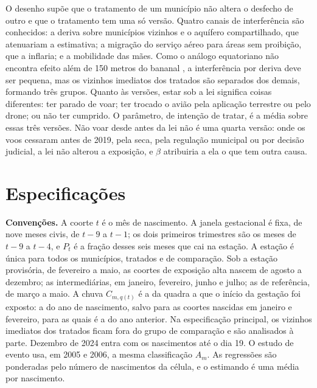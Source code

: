 \begin{apendicesenv}
O desenho supõe que o tratamento de um município não altera o desfecho de
outro e que o tratamento tem uma só versão. Quatro canais de interferência
são conhecidos: a deriva sobre municípios vizinhos e o aquífero compartilhado,
que atenuariam a estimativa; a migração do serviço aéreo para áreas sem
proibição, que a inflaria; e a mobilidade das mães. Como o análogo equatoriano não encontra efeito além de 150 metros do
bananal \cite{calzada2023bananas}, a interferência por deriva deve ser
pequena, mas os vizinhos imediatos dos tratados são separados dos demais,
formando três grupos. Quanto às versões, estar sob a lei significa coisas
diferentes: ter parado de voar; ter trocado o avião pela aplicação terrestre
ou pelo drone; ou não ter cumprido. O parâmetro, de intenção de tratar, é a
média sobre essas três versões. Não voar desde antes da lei não é uma quarta
versão: onde os voos cessaram antes de 2019, pela seca, pela regulação
municipal ou por decisão judicial, a lei não alterou a exposição, e $\beta$
atribuiria a ela o que tem outra causa.

\clearpage
\chapter{Especificações}
\label{ap:espec}

\textbf{Convenções.} A coorte $t$ é o mês de nascimento. A janela gestacional
é fixa, de nove meses civis, de $t-9$ a $t-1$; os dois primeiros trimestres
são os meses de $t-9$ a $t-4$, e $P_t$ é a fração desses seis meses que cai na
estação. A estação é única para todos os municípios, tratados e de comparação.
Sob a estação provisória, de fevereiro a maio, as coortes de exposição alta
nascem de agosto a dezembro; as intermediárias, em janeiro, fevereiro, junho e
julho; as de referência, de março a maio. A chuva $C_{m,q(t)}$ é a da quadra a
que o início da gestação foi exposto: a do ano de nascimento, salvo para as
coortes nascidas em janeiro e fevereiro, para as quais é a do ano anterior. Na
especificação principal, os vizinhos imediatos dos tratados ficam fora do
grupo de comparação e são analisados à parte. Dezembro de 2024 entra com os
nascimentos até o dia 19. O estudo de evento usa, em 2005 e 2006, a mesma
classificação $A_m$. As regressões são ponderadas pelo número de nascimentos
da célula, e o estimando é uma média por nascimento.


\end{apendicesenv}

